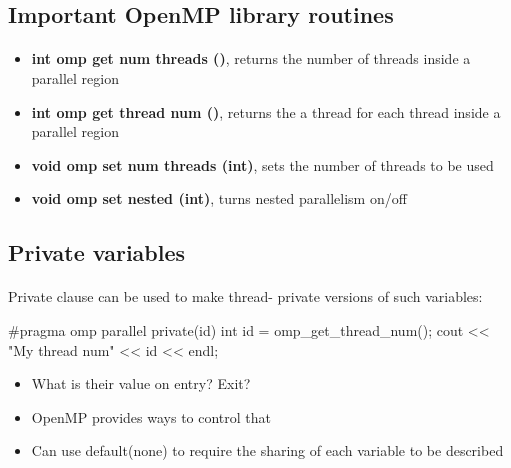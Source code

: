 \documentclass[%
oneside,                 %
final,                   %
10pt]{article}
\begin{document}
\noindent



\subsection{Important OpenMP library routines}

\paragraph{}

\begin{itemize}
\item \textbf{int omp get num threads ()}, returns the number of threads inside a parallel region

\item \textbf{int omp get thread num ()},  returns the  a thread for each thread inside a parallel region

\item \textbf{void omp set num threads (int)}, sets the number of threads to be used

\item \textbf{void omp set nested (int)},  turns nested parallelism on/off
\end{itemize}

\noindent



\subsection{Private variables}

\paragraph{}
Private clause can be used to make thread- private versions of such variables: 






\bcppcod
#pragma omp parallel private(id)
{
 int id = omp_get_thread_num();
 cout << "My thread num" << id << endl; 
}

\ecppcod

\begin{itemize}
\item What is their value on entry? Exit?

\item OpenMP provides ways to control that

\item Can use default(none) to require the sharing of each variable to be described
\end{itemize}
\end{document}
